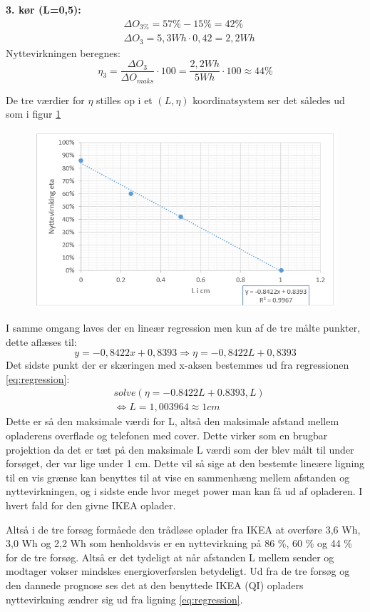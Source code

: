 \textbf{3. kør (L=0,5):}
\begin{align*}
& \Delta O_{3\%} = 57\%-15\% =  42\%  \\
& \Delta O_3 = 5,3 Wh \cdot 0,42 = 2,2 Wh
\end{align*}
Nyttevirkningen beregnes:
\begin{equation}
\eta_3 = \frac{\Delta O_3}{\Delta O_{maks}} \cdot 100 = \frac{2,2 Wh}{5 Wh} \cdot 100 \approx 44 \%
\label{eq:nyt3}
\end{equation}

De tre værdier for $\eta$ stilles op i et $(L,\eta)$ koordinatsystem ser det således ud som i figur \ref{figure:graf4}

\begin{figure}[H]
\includegraphics[width=1\textwidth]{Setup/forsg2_graf4}
\caption{}
\label{figure:graf4}
\end{figure}
I samme omgang laves der en lineær regression men kun af de tre målte punkter, dette aflæses til:
\begin{equation}
y=-0,8422x+0,8393 \Rightarrow \eta = -0,8422L+0,8393
\label{eq:regression}
\end{equation}
Det sidste punkt der er skæringen med x-aksen bestemmes ud fra regressionen \ref{eq:regression}:
\begin{align*}
& solve(\eta =-0.8422L+0.8393,L) \\
& \Leftrightarrow L = 1,003964 \approx 1 cm
\end{align*} 
Dette er så den maksimale værdi for L, altså den maksimale afstand mellem opladerens overflade og telefonen med cover. Dette virker som en brugbar projektion da det er tæt på den maksimale L værdi som der blev målt til under forsøget, der var lige under 1 cm. Dette vil så sige at den bestemte lineære ligning til en vis grænse kan benyttes til at vise en sammenhæng mellem afstanden og nyttevirkningen, og i sidste ende hvor meget power man kan få ud af opladeren. I hvert fald for den givne IKEA oplader.

Altså i de tre forsøg formåede den trådløse oplader fra IKEA at overføre 3,6 Wh, 3,0 Wh og 2,2 Wh som henholdsvis er en nyttevirkning på 86 \%, 60 \% og 44 \% for de tre forsøg. Altså er det tydeligt at når afstanden L mellem sender og modtager vokser mindskes energioverførslen betydeligt. Ud fra de tre forsøg og den dannede prognose ses det at den benyttede IKEA (QI) opladers nyttevirkning ændrer sig ud fra ligning \ref{eq:regression}.